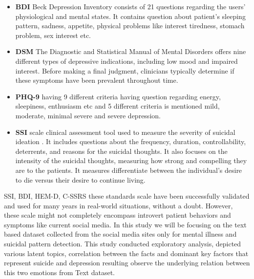 \documentclass[sn-mathphys,Numbered]{sn-jnl}%
\theoremstyle{thmstyleone}%
\theoremstyle{thmstyletwo}%
\theoremstyle{thmstylethree}%
\begin{document}
\begin{itemize}
\item 
\textbf{BDI} Beck Depression Inventory \cite{beck2000weisman} consists of 21 questions regarding the users' physiological and mental states. It contains question about patient's sleeping pattern, sadness, appetite, physical problems like interest tiredness, stomach problem, sex interest etc. 
\item 
\textbf{DSM} The Diagnostic and Statistical Manual of Mental Disorders \cite{whooley2014diagnostic} offers nine different types of depressive indications, including low mood and impaired interest. Before making a final judgment, clinicians typically determine if these symptoms have been prevalent throughout time. 
\item 
\textbf{PHQ-9} having 9 different criteria having question regarding energy, sleepiness, enthusiasm etc and 5 different criteria is mentioned mild, moderate, minimal severe and severe depression. 
\item 
\textbf{SSI} scale clinical assessment tool used to measure the severity of suicidal ideation \cite{shen2020detecting}. It includes questions about the frequency, duration, controllability, deterrents, and reasons for the suicidal thoughts. It also focuses on the intensity of the suicidal thoughts, measuring how strong and compelling they are to the patients. It measures differentiate between the individual's desire to die versus their desire to continue living.
\end{itemize}

SSI, BDI, HEM-D, C-SSRS these standards scale have been successfully validated and used for many years in real-world situations, without a doubt. However, these scale might not completely encompass introvert patient behaviors and symptoms like current social media. In this study we will be focusing on the text based dataset collected from the social media sites only for mental illness and suicidal pattern detection. This study conducted exploratory analysis, depicted various latent topics, correlation between the facts and dominant key factors that represent suicide and depression resulting observe the underlying relation between this two emotions from Text dataset. 
\end{document}
